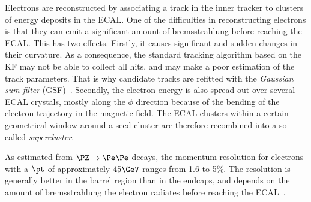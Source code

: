 Electrons are reconstructed by associating a track in the inner tracker to clusters of energy deposits in the ECAL.
One of the difficulties in reconstructing electrons is that they can emit a significant amount of bremsstrahlung before reaching the ECAL.
This has two effects.
Firstly, it causes significant and sudden changes in their curvature.
As a consequence, the standard tracking algorithm based on the KF may not be able to collect all hits, and may make a poor estimation of the track parameters. That is why candidate tracks are refitted with the \emph{Gaussian sum filter} (GSF)~\cite{GSF}.
Secondly, the electron energy is also spread out over several ECAL crystals, mostly along the $\phi$ direction because of the bending of the electron trajectory in the magnetic field.
The ECAL clusters within a certain geometrical window around a seed cluster are therefore recombined into a so-called \emph{supercluster}.

As estimated from $\PZ\to\Pe\Pe$ decays, the momentum resolution for electrons with a $\pt$ of approximately $45\GeV$ ranges from 1.6 to 5\%.
The resolution is generally better in the barrel region than in the endcaps, and depends on the amount of bremsstrahlung the electron radiates before reaching the ECAL~\cite{CMS_electron_2021,CMS_electron_calibration_2016}.

